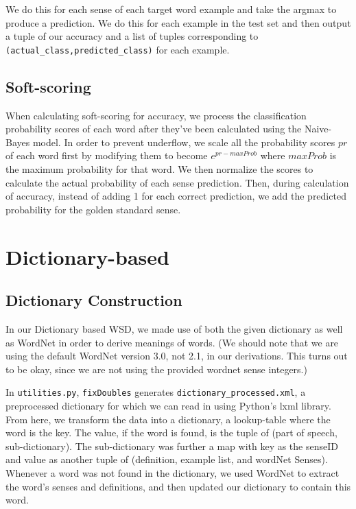 \documentclass{article}
\begin{document}
We do this for each sense of each target word example and take the argmax to produce a prediction. We do this for each example in the test set and then output a tuple of our accuracy and a list of tuples corresponding to \texttt{(actual\_class,predicted\_class)} for each example. 

\subsection{Soft-scoring}
When calculating soft-scoring for accuracy, we process the classification probability scores of each word after they've been calculated using the Naive-Bayes model. In order to prevent underflow, we scale all the probability scores $pr$ of each word first by modifying them to become $e^{pr-maxProb}$ where $maxProb$ is the maximum probability for that word. We then normalize the scores to calculate the actual probability of each sense prediction. Then, during calculation of accuracy, instead of adding 1 for each correct prediction, we add the predicted probability for the golden standard sense.

\section{Dictionary-based}

\subsection{Dictionary Construction}
In our Dictionary based WSD, we made use of both the given dictionary as well as WordNet in order to derive meanings of words. (We should note that we are using the default WordNet version 3.0, not 2.1, in our derivations. This turns out to be okay, since we are not using the provided wordnet sense integers.)

In \texttt{utilities.py}, \texttt{fixDoubles} generates \texttt{dictionary\_processed.xml}, a preprocessed dictionary for which we can read in using Python's lxml library. From here, we transform the data into a dictionary, a lookup-table where the word is the key. The value, if the word is found, is the tuple of (part of speech, sub-dictionary). The sub-dictionary was further a map with key as the senseID and value as another tuple of (definition, example list, and wordNet Senses). Whenever a word was not found in the dictionary, we used WordNet to extract the word's senses and definitions, and then updated our dictionary to contain this word.
\end{document}
